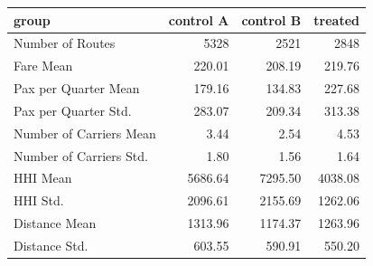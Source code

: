 \begin{tabular}{lrrr}
\toprule
group & control A & control B & treated \\
\midrule
Number of Routes & 5328 & 2521 & 2848 \\
Fare Mean & 220.01 & 208.19 & 219.76 \\
Pax per Quarter Mean & 179.16 & 134.83 & 227.68 \\
Pax per Quarter Std. & 283.07 & 209.34 & 313.38 \\
Number of Carriers Mean & 3.44 & 2.54 & 4.53 \\
Number of Carriers Std. & 1.80 & 1.56 & 1.64 \\
HHI Mean & 5686.64 & 7295.50 & 4038.08 \\
HHI Std. & 2096.61 & 2155.69 & 1262.06 \\
Distance Mean & 1313.96 & 1174.37 & 1263.96 \\
Distance Std. & 603.55 & 590.91 & 550.20 \\
\bottomrule
\end{tabular}
